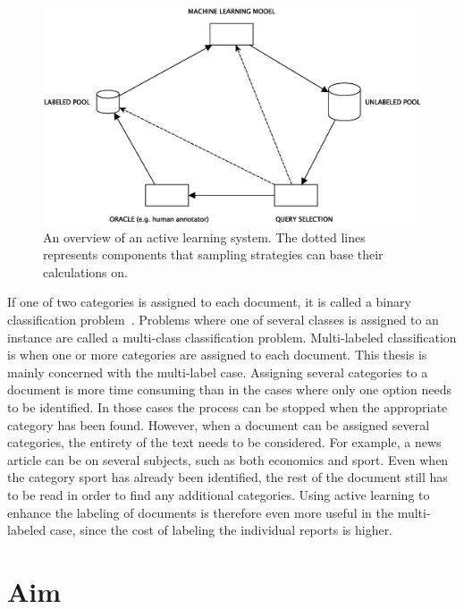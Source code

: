 \begin{figure}
    \centering
    \includegraphics[width=\textwidth]{figures/active-learning-model.eps}
    \caption{An overview of an active learning system. 
    The dotted lines represents components that sampling strategies can base their calculations on.}
    \label{fig:active-learning-model}
\end{figure}

If one of two categories is assigned to each document, it is called a binary classification problem~\cite{bishop2006pattern}.
Problems where one of several classes is assigned to an instance are called a multi-class classification problem.
Multi-labeled classification is when one or more categories are assigned to each document.
This thesis is mainly concerned with the multi-label case.
Assigning several categories to a document is more time consuming than in the cases where only one option needs to be identified.
In those cases the process can be stopped when the appropriate category has been found.
However, when a document can be assigned several categories, the entirety of the text needs to be considered.
For example, a news article can be on several subjects, such as both economics and sport.
Even when the category sport has already been identified, the rest of the document still has to be read in order to find any additional categories.
Using active learning to enhance the labeling of documents is therefore even more useful in the multi-labeled case, since the cost of labeling the individual reports is higher.

\section{Aim}
\label{sec:aim}

